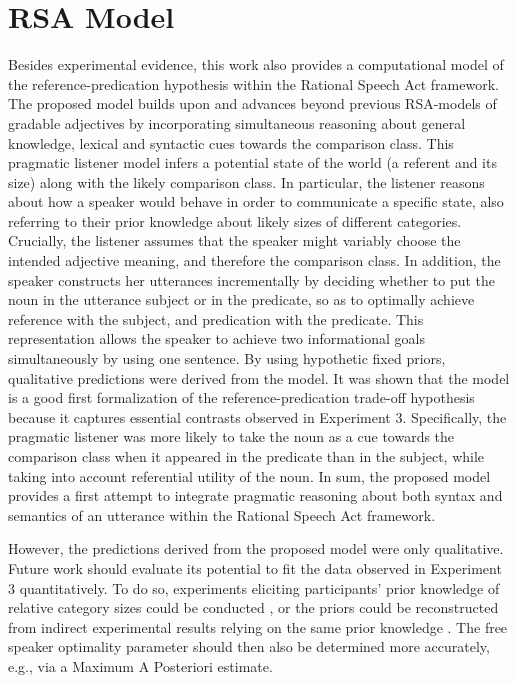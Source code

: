 \section{RSA Model}
Besides experimental evidence, this work also provides a computational model of the reference-predication hypothesis within the Rational Speech Act framework. The proposed model builds upon and advances beyond previous RSA-models of gradable adjectives by incorporating simultaneous reasoning about general knowledge, lexical and syntactic cues towards the comparison class. This pragmatic listener model infers a potential state of the world (a referent and its size) along with the likely comparison class. In particular, the listener reasons about how a speaker would behave in order to communicate a specific state, also referring to their prior knowledge about likely sizes of different categories. Crucially, the listener assumes that the speaker might variably choose the intended adjective meaning, and therefore the comparison class. 
In addition, the speaker constructs her utterances incrementally by deciding whether to put the noun in the utterance subject or in the predicate, so as to optimally achieve reference with the subject, and predication with the predicate. This representation allows the speaker to achieve two informational goals simultaneously by using one sentence. By using hypothetic fixed priors, qualitative predictions were derived from the model. It was shown that the model is a good first formalization of the reference-predication trade-off hypothesis because it captures essential contrasts observed in Experiment 3. Specifically, the pragmatic listener was more likely to take the noun as a cue towards the comparison class when it appeared in the predicate than in the subject, while taking into account referential utility of the noun. In sum, the proposed model provides a first attempt to integrate pragmatic reasoning about both syntax and semantics of an utterance within the Rational Speech Act framework. 

However, the predictions derived from the proposed model were only qualitative. Future work should evaluate its potential to fit the data observed in Experiment 3 quantitatively. To do so, experiments eliciting participants' prior knowledge of relative category sizes could be conducted \parencite{franke2016does}, or the priors could be reconstructed from indirect experimental results relying on the same prior knowledge \parencite[following][]{tessler2017warm}. The free speaker optimality parameter should then also be determined more accurately, e.g., via a Maximum A Posteriori estimate. %

